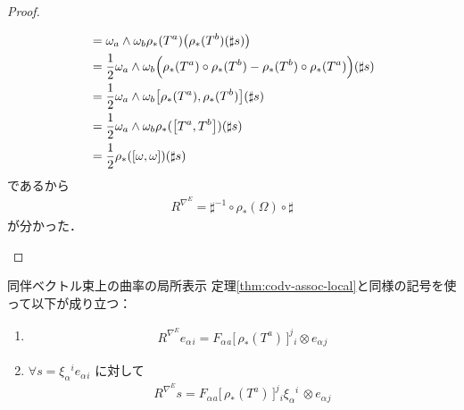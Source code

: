 \documentclass[TQFT_main]{subfiles}
\begin{document}
\begin{proof}
\begin{enumerate}
\begin{align}
            &= \omega_a \wedge \omega_b \rho_*(T^a) \bigl( \rho_*(T^b)(\sharp s) \bigr)  \\
            &= \frac{1}{2} \omega_a \wedge \omega_b \Bigl(\rho_*(T^a) \circ \rho_*(T^b) - \rho_*(T^b) \circ \rho_*(T^a) \Bigr)(\sharp s) \\
            &= \frac{1}{2} \omega_a \wedge \omega_b \comm{\rho_*(T^a)}{\rho_*(T^b)}(\sharp s) \\
            &= \frac{1}{2} \omega_a \wedge \omega_b \rho_*(\comm{T^a}{T^b})(\sharp s) \\
            &= \frac{1}{2} \rho_*(\comm{\omega}{\omega})(\sharp s)
        \end{align}
        であるから
        \begin{align}
            R^{\nabla^E} = \sharp^{-1} \circ \rho_*(\Omega)  \circ \sharp
        \end{align}
        が分かった．

    \end{enumerate}
\end{proof}

\begin{mytheo}[label=thm:curvature-assoc-local]{同伴ベクトル束上の曲率の局所表示}
    定理\ref{thm:codv-assoc-local}と同様の記号を使って以下が成り立つ：
    \begin{enumerate}
        \item \begin{align}
            R^{\nabla^E} e_{\alpha}{}_i = F_\alpha{}_a \bigl[\, \rho_*(T^a) \,\bigr]^j{}_i \otimes  e_\alpha{}_j
        \end{align}
        \item $\forall s = \xi_\alpha{}^i e_{\alpha}{}_i$ に対して
        \begin{align}
            R^{\nabla^E} s = F_\alpha{}_a \bigl[\, \rho_*(T^a) \,\bigr]^j{}_i \xi_\alpha{}^i\, \otimes  e_\alpha{}_j
        \end{align}
        
    \end{enumerate}
    
\end{mytheo}
\end{document}
